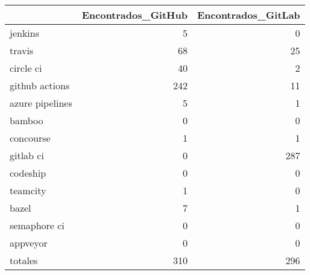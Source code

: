 \begin{tabular}{lrr}
\toprule
{} &  Encontrados\_GitHub &  Encontrados\_GitLab \\
\midrule
jenkins         &                   5 &                   0 \\
travis          &                  68 &                  25 \\
circle ci       &                  40 &                   2 \\
github actions  &                 242 &                  11 \\
azure pipelines &                   5 &                   1 \\
bamboo          &                   0 &                   0 \\
concourse       &                   1 &                   1 \\
gitlab ci       &                   0 &                 287 \\
codeship        &                   0 &                   0 \\
teamcity        &                   1 &                   0 \\
bazel           &                   7 &                   1 \\
semaphore ci    &                   0 &                   0 \\
appveyor        &                   0 &                   0 \\
totales         &                 310 &                 296 \\
\bottomrule
\end{tabular}
